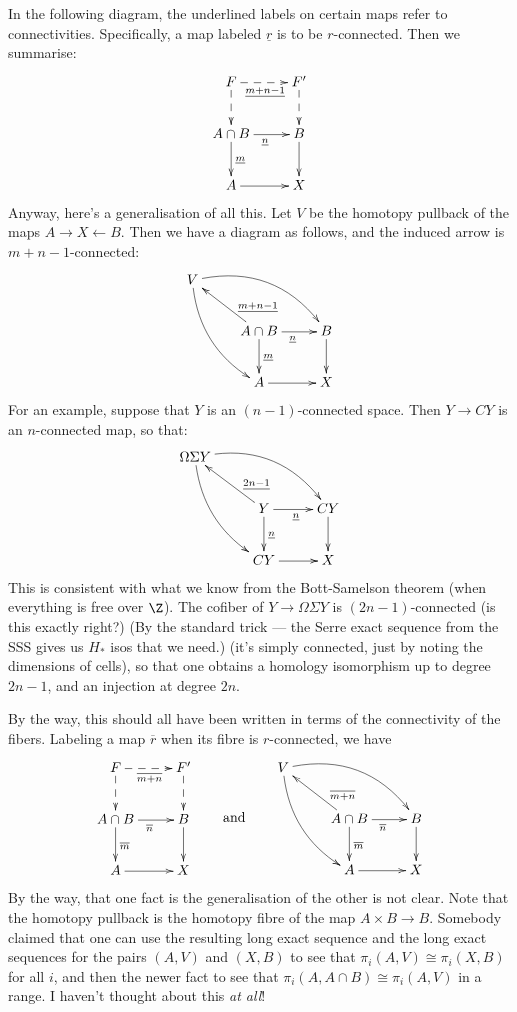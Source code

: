 \documentclass[11pt]{article}
\begin{document}
\begin{FirstTen}
In the following diagram, the underlined labels on certain maps refer to
connectivities. Specifically, a map labeled $\underline r$ is to be
$r$-connected. Then we summarise:
\[\xymatrix{
F\ar@{-->}[r]_{\underline{m+n-1}}\ar@{-->}[d]&F'\ar@{-->}[d]\\
A\cap B\ar[d]^{\underline{m}}\ar[r]_{\underline{{n}}}&B\ar[d]\\
A\ar[r]&X
}\]
Anyway, here's a generalisation of all this. Let $V$ be the homotopy pullback of
the maps $A\rightarrow X\leftarrow B$. Then we have a diagram as follows, and
the induced arrow is $m+n-1$-connected:
\[\xymatrix{
V\ar@/_1pc/[ddr]\ar@/^1.5pc/[rrd]\\
&A\cap B\ar[ul]_(.3){\underline{m+n-1}}\ar[d]^{\underline{m}}
\ar[r]_{\underline{{n}}}&B\ar[d]\\
&A\ar[r]&X
}\]
For an example, suppose that $Y$ is an $(n-1)$-connected space. Then $Y\to CY$
is an $n$-connected map, so that:
\[\xymatrix{
\Omega\Sigma Y\ar@/_1pc/[ddr]\ar@/^1.5pc/[rrd]\\
&Y\ar[ul]_(.3){\underline{2n-1}}\ar[d]^{\underline{n}}
\ar[r]_{\underline{{n}}}&CY\ar[d]\\
&CY\ar[r]&X
}\]
This is consistent with what we know from the Bott-Samelson theorem (when
everything is free over $\Z$). The cofiber of $Y\to \Omega\Sigma Y$ is
$(2n-1)$-connected (is this exactly right?) (By the standard trick --- the Serre
exact sequence from the SSS gives us $H_*$ isos that we need.) (it's simply
connected, just by noting the dimensions of cells), so that one obtains a
homology isomorphism up to degree $2n-1$, and an injection at degree $2n$.

By the way, this should all have been written in terms of the connectivity of
the fibers. Labeling a map $\overline r$ when its fibre is $r$-connected, we
have
\[
\xymatrix{
F\ar@{-->}[r]_{\overline{m+n}}\ar@{-->}[d]&F'\ar@{-->}[d]\\
A\cap B\ar[d]^{\overline{m}}\ar[r]_{\overline{{n}}}&B\ar[d]\\
A\ar[r]&X
}\raisebox{-1.26cm}{\qquad and\qquad }\xymatrix{
V\ar@/_1pc/[ddr]\ar@/^1.5pc/[rrd]\\
&A\cap B\ar[ul]_(.3){\overline{m+n}}\ar[d]^{\overline{m}}
\ar[r]_{\overline{{n}}}&B\ar[d]\\
&A\ar[r]&X
}\]
By the way, that one fact is the generalisation of the other is not clear. Note
that the homotopy pullback is the homotopy fibre of the map $A\times B\to B$.
Somebody claimed that one can use the resulting long exact sequence and the long
exact sequences for the pairs $(A,V)$ and $(X,B)$ to see that
$\pi_i(A,V)\cong\pi_i(X,B)$ for all $i$, and then the newer fact to see that
$\pi_i(A,A\cap B)\cong\pi_i(A,V)$ in a range. I haven't thought about this
\emph{at all}!




\end{FirstTen}
\end{document}
